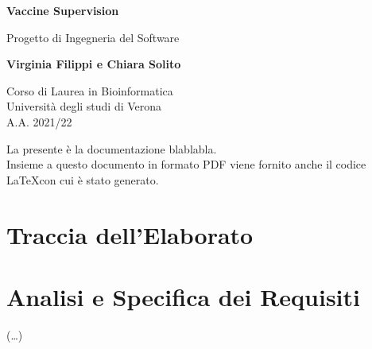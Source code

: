 \documentclass{article}
\begin{document}
\newcommand\tab[1][0.3cm]{\hspace*{#1}}


\begin{titlepage}
    \begin{center}
        \vspace*{1cm}
            
        \Huge
        \textbf{Vaccine Supervision}
            
        \vspace{0.5cm}
        \LARGE
        Progetto di Ingegneria del Software
            
        \vspace{1.5cm}
            
        \textbf{Virginia Filippi e Chiara Solito}

        \vspace{0.8cm}

            
        \Large
        Corso di Laurea in Bioinformatica\\
        Università degli studi di Verona\\
        A.A. 2021/22
            
    \end{center}
\end{titlepage}
La presente è la documentazione blablabla.\\
Insieme a questo documento in formato PDF viene fornito anche il codice \LaTeX  con cui è stato generato.
\tableofcontents
\thispagestyle{empty}
\newpage
\thispagestyle{empty}

\section{Traccia dell'Elaborato}
\section{Analisi e Specifica dei Requisiti}
(\dots )\\
\end{document}
